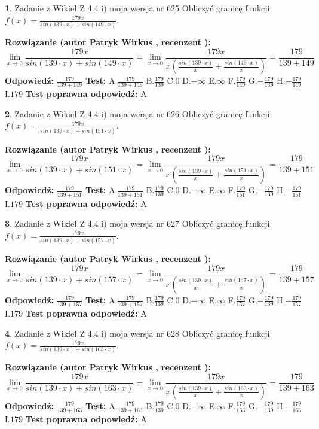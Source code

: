 \documentclass[12pt, a4paper]{article}
\theoremstyle{definition} %
\newtheorem{zad}{}
\newcommand{\zadStart}[1]{\begin{zad}#1\newline}
\newcommand{\zadStop}{\end{zad}}
\newcommand{\rozwStart}[2]{\noindent \textbf{Rozwiązanie (autor #1 , recenzent #2): }\newline}
\newcommand{\rozwStop}{\newline}
\newcommand{\odpStart}{\noindent \textbf{Odpowiedź:}\newline}
\newcommand{\odpStop}{\newline}
\newcommand{\testStart}{\noindent \textbf{Test:}\newline}
\newcommand{\testStop}{\newline}
\newcommand{\kluczStart}{\noindent \textbf{Test poprawna odpowiedź:}\newline}
\newcommand{\kluczStop}{\newline}
\begin{document}
\zadStart{Zadanie z Wikieł Z 4.4 i) moja wersja nr 625}
Obliczyć granicę funkcji $f(x)=\frac{179x}{sin(139\cdot x) +sin(149\cdot x)}$.
\zadStop
\rozwStart{Patryk Wirkus}{}
$$\lim\limits_{x\to 0}\frac{179x}{sin(139\cdot x) +sin(149\cdot x)}=\lim\limits_{x\to 0}\frac{179x}{x(\frac{sin(139\cdot x)}{x}+\frac{sin(149\cdot x)}{x})}=\frac{179}{139+149}$$
\rozwStop
\odpStart
$\frac{179}{139+149}$
\odpStop
\testStart
A.$\frac{179}{139+149}$
B.$\frac{179}{139}$
C.$0$
D.$-\infty$
E.$\infty$
F.$\frac{179}{149}$
G.$-\frac{179}{139}$
H.$-\frac{179}{149}$
I.$179$
\testStop
\kluczStart
A
\kluczStop



\zadStart{Zadanie z Wikieł Z 4.4 i) moja wersja nr 626}
Obliczyć granicę funkcji $f(x)=\frac{179x}{sin(139\cdot x) +sin(151\cdot x)}$.
\zadStop
\rozwStart{Patryk Wirkus}{}
$$\lim\limits_{x\to 0}\frac{179x}{sin(139\cdot x) +sin(151\cdot x)}=\lim\limits_{x\to 0}\frac{179x}{x(\frac{sin(139\cdot x)}{x}+\frac{sin(151\cdot x)}{x})}=\frac{179}{139+151}$$
\rozwStop
\odpStart
$\frac{179}{139+151}$
\odpStop
\testStart
A.$\frac{179}{139+151}$
B.$\frac{179}{139}$
C.$0$
D.$-\infty$
E.$\infty$
F.$\frac{179}{151}$
G.$-\frac{179}{139}$
H.$-\frac{179}{151}$
I.$179$
\testStop
\kluczStart
A
\kluczStop



\zadStart{Zadanie z Wikieł Z 4.4 i) moja wersja nr 627}
Obliczyć granicę funkcji $f(x)=\frac{179x}{sin(139\cdot x) +sin(157\cdot x)}$.
\zadStop
\rozwStart{Patryk Wirkus}{}
$$\lim\limits_{x\to 0}\frac{179x}{sin(139\cdot x) +sin(157\cdot x)}=\lim\limits_{x\to 0}\frac{179x}{x(\frac{sin(139\cdot x)}{x}+\frac{sin(157\cdot x)}{x})}=\frac{179}{139+157}$$
\rozwStop
\odpStart
$\frac{179}{139+157}$
\odpStop
\testStart
A.$\frac{179}{139+157}$
B.$\frac{179}{139}$
C.$0$
D.$-\infty$
E.$\infty$
F.$\frac{179}{157}$
G.$-\frac{179}{139}$
H.$-\frac{179}{157}$
I.$179$
\testStop
\kluczStart
A
\kluczStop



\zadStart{Zadanie z Wikieł Z 4.4 i) moja wersja nr 628}
Obliczyć granicę funkcji $f(x)=\frac{179x}{sin(139\cdot x) +sin(163\cdot x)}$.
\zadStop
\rozwStart{Patryk Wirkus}{}
$$\lim\limits_{x\to 0}\frac{179x}{sin(139\cdot x) +sin(163\cdot x)}=\lim\limits_{x\to 0}\frac{179x}{x(\frac{sin(139\cdot x)}{x}+\frac{sin(163\cdot x)}{x})}=\frac{179}{139+163}$$
\rozwStop
\odpStart
$\frac{179}{139+163}$
\odpStop
\testStart
A.$\frac{179}{139+163}$
B.$\frac{179}{139}$
C.$0$
D.$-\infty$
E.$\infty$
F.$\frac{179}{163}$
G.$-\frac{179}{139}$
H.$-\frac{179}{163}$
I.$179$
\testStop
\kluczStart
A
\kluczStop
\end{document}
